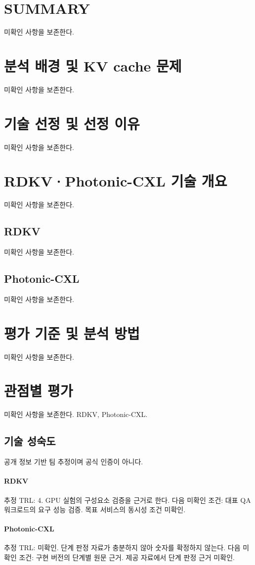 \documentclass[11pt,a4paper]{article}
\begin{document}
\section{SUMMARY}
미확인 사항을 보존한다.
\section{분석 배경 및 KV cache 문제}
미확인 사항을 보존한다.
\section{기술 선정 및 선정 이유}
미확인 사항을 보존한다.
\section{RDKV·Photonic-CXL 기술 개요}
미확인 사항을 보존한다.
\subsection{RDKV}
미확인 사항을 보존한다.
\subsection{Photonic-CXL}
미확인 사항을 보존한다.
\section{평가 기준 및 분석 방법}
미확인 사항을 보존한다.
\section{관점별 평가}
미확인 사항을 보존한다. RDKV\cite{SW01_RDKV}, Photonic-CXL\cite{HW01_PHOTONIC_CXL}.
\subsection{기술 성숙도}
공개 정보 기반 팀 추정이며 공식 인증이 아니다.
\paragraph{RDKV}
추정 TRL: 4. GPU 실험의 구성요소 검증을 근거로 한다.\cite{SW01_RDKV}
다음 미확인 조건: 대표 QA 워크로드의 요구 성능 검증.
목표 서비스의 동시성 조건 미확인.
\paragraph{Photonic-CXL}
추정 TRL: 미확인. 단계 판정 자료가 충분하지 않아 숫자를 확정하지 않는다.
다음 미확인 조건: 구현 버전의 단계별 원문 근거.
제공 자료에서 단계 판정 근거 미확인.
\end{document}
